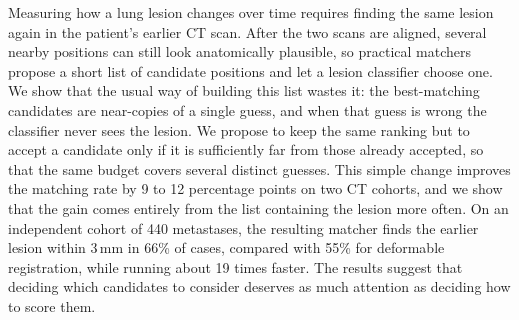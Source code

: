 Measuring how a lung lesion changes over time requires finding the same lesion again in the patient's earlier CT scan.
After the two scans are aligned, several nearby positions can still look anatomically plausible, so practical matchers propose a short list of candidate positions and let a lesion classifier choose one.
We show that the usual way of building this list wastes it: the best-matching candidates are near-copies of a single guess, and when that guess is wrong the classifier never sees the lesion.
We propose to keep the same ranking but to accept a candidate only if it is sufficiently far from those already accepted, so that the same budget covers several distinct guesses.
This simple change improves the matching rate by 9 to 12 percentage points on two CT cohorts, and we show that the gain comes entirely from the list containing the lesion more often.
On an independent cohort of 440 metastases, the resulting matcher finds the earlier lesion within 3\,mm in 66\% of cases, compared with 55\% for deformable registration, while running about 19 times faster.
The results suggest that deciding which candidates to consider deserves as much attention as deciding how to score them.
